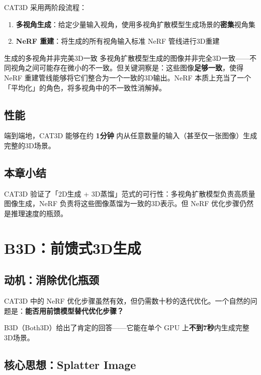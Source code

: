 \documentclass[a4paper]{article}
\begin{document}
CAT3D 采用两阶段流程：

\begin{enumerate}
    \item \textbf{多视角生成}：给定少量输入视角，使用多视角扩散模型生成场景的\textbf{密集}视角集
    \item \textbf{NeRF 重建}：将生成的所有视角输入标准 NeRF 管线进行3D重建
\end{enumerate}

\begin{warningbox}{生成的多视角并非完美3D一致}
多视角扩散模型生成的图像并非完全3D一致——不同视角之间可能存在微小的不一致。但关键洞察是：这些图像\textbf{足够一致}，使得 NeRF 重建管线能够将它们整合为一个一致的3D输出。NeRF 本质上充当了一个「平均化」的角色，将多视角中的不一致性消解掉。
\end{warningbox}

\subsection{性能}

端到端地，CAT3D 能够在约 \textbf{1分钟} 内从任意数量的输入（甚至仅一张图像）生成完整的3D场景。

\subsection{本章小结}

CAT3D 验证了「2D生成 + 3D蒸馏」范式的可行性：多视角扩散模型负责高质量图像生成，NeRF 负责将这些图像蒸馏为一致的3D表示。但 NeRF 优化步骤仍然是推理速度的瓶颈。

\section{B3D：前馈式3D生成}

\subsection{动机：消除优化瓶颈}

CAT3D 中的 NeRF 优化步骤虽然有效，但仍需数十秒的迭代优化。一个自然的问题是：\textbf{能否用前馈模型替代优化步骤？}

B3D（Both3D）给出了肯定的回答——它能在单个 GPU 上\textbf{不到7秒}内生成完整3D场景。

\subsection{核心思想：Splatter Image}
\end{document}
